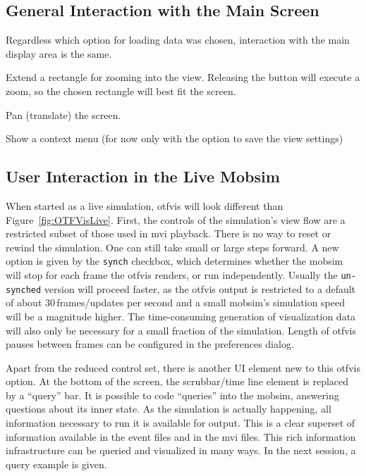\subsection{General Interaction with the Main Screen}
Regardless which option for loading data was chosen, interaction with the main display area is the same.
%
\begin{description}\styleDescription
\item[Right button drag:] Extend a rectangle for zooming into the view. Releasing the button will execute a zoom, so the chosen rectangle will best fit the screen.
\item[Middle-Mouse-drag:] Pan (translate) the screen.
\item[Right-Mouse-Click:] Show a context menu (for now only with the option to save the view settings)
\end{description}

\subsection{User Interaction in the Live Mobsim}
When started as a live simulation, \gls{otfvis} will look different than Figure~\ref{fig:OTFVisLive}. 
First, the controls of the simulation's view flow are a restricted subset of those used in \gls{mvi} playback. 
There is no way to reset or rewind the simulation. 
One can still take small or large steps forward. 
A new option is given by the \lstinline|synch| checkbox, which 
determines whether the \gls{mobsim} will stop for each frame the \gls{otfvis} renders, or run independently. 
Usually the \lstinline|un-synched| version will proceed faster, as the \gls{otfvis} output is restricted to a default of about 30\,frames/updates per second and a small \gls{mobsim}'s simulation speed will be a magnitude higher. 
The time-consuming generation of visualization data will also only be necessary for a small fraction of the simulation. 
Length of \gls{otfvis} pauses between frames can be configured in the preferences dialog.

Apart from the reduced control set, there is another UI element new to this \gls{otfvis} option. 
At the bottom of the screen, the scrubbar/time line element is replaced by a ``query'' bar. 
It is possible to code ``queries'' into the \gls{mobsim}, answering questions about its inner state. 
As the simulation is actually happening, all information necessary to run it is available for output. 
This is a clear superset of information available in the event files and in the \gls{mvi} files. 
This rich information infrastructure can be queried and visualized in many ways. 
In the next session, a query example is given.

